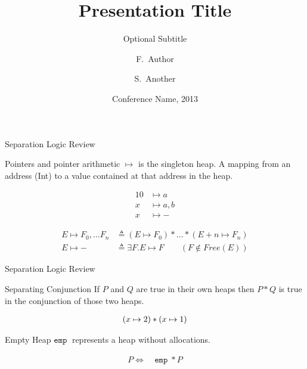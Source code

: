 \documentclass{beamer}
\title{Presentation Title}
\subtitle{Optional Subtitle}
\author{F.~Author\inst{1} \and S.~Another\inst{2}}
\institute[Universities of Somewhere and Elsewhere] %
{
  \inst{1}%
  Department of Computer Science\\
  University of Somewhere
  \and
  \inst{2}%
  Department of Theoretical Philosophy\\
  University of Elsewhere}
\date{Conference Name, 2013}
\newcommand{\mtt}[1]{
  \mathtt{#1}\;
}
\begin{document}
\setlength{\abovedisplayskip}{0pt}
\setlength{\belowdisplayskip}{0pt}
\setlength{\abovedisplayshortskip}{0pt}
\setlength{\belowdisplayshortskip}{0pt}

\begin{frame}{Separation Logic Review}
  \begin{block}{Pointers and pointer arithmetic}
    $\mapsto$ is the singleton heap. A mapping from an address (Int) to a value contained at that address in the heap.
  \end{block}

  \begin{example}
    \begin{align*}
      10 &\mapsto a \\
      x &\mapsto a,b \\
      x &\mapsto -
    \end{align*}

\vspace{0.5cm}

    \begin{mdframed}[outerlinewidth=2]
      \begin{align*}
        E \mapsto F_0,...F_n & \triangleq (E \mapsto F_0) * ... * (E + n \mapsto F_n)\\
        E \mapsto - & \triangleq \exists F.E \mapsto F \qquad (F \notin Free(E))
      \end{align*}
    \end{mdframed}
  \end{example}
\end{frame}


\begin{frame}{Separation Logic Review}
  \begin{block}{Separating Conjunction}
    If $P$ and $Q$ are true in their own heaps then $P * Q$ is true in the conjunction of those two heaps.
  \end{block}

  \begin{example}
    \begin{align*}
      \vspace*{-1cm}
      (x \mapsto 2) * (x \mapsto 1)
    \end{align*}
  \end{example}

  \begin{block}{Empty Heap}
    $\mtt{emp}$ represents a heap without allocations.
  \end{block}

  \begin{example}
    \begin{align*}
      P \Leftrightarrow\ &\mtt{emp} * P
    \end{align*}
  \end{example}
\end{frame}
\end{document}
